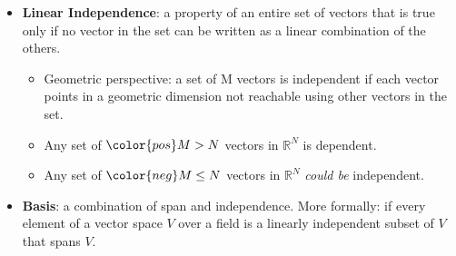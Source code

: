 \documentclass[12pt,a4paper]{article}
\begin{document}
\begin{itemize}
    \item \textbf{Linear Independence}: a property of an entire set of vectors that is true only if no vector in the set can be written as a linear combination of the others.
        \begin{itemize}
            \item Geometric perspective: a set of M vectors is independent if each vector points in a geometric dimension not reachable using other vectors in the set.
            \item Any set of \({\color{pos}M>N}\) vectors in \(\mathbb{R}^N\) is {\color{o-Sun}dependent}.
            \item Any set of \({\color{neg}M\leq N}\) vectors in \(\mathbb{R}^N\) \textit{could be} {\color{o-Sun}independent}.
        \end{itemize}
    \item \textbf{Basis}: a combination of span and independence. More formally: if every element of a vector space \(V\) over a field is a {\color{o-Sun}linearly independent subset} of \(V\) that {\color{o-Sun}spans} \(V\).
\end{itemize}
\end{document}
